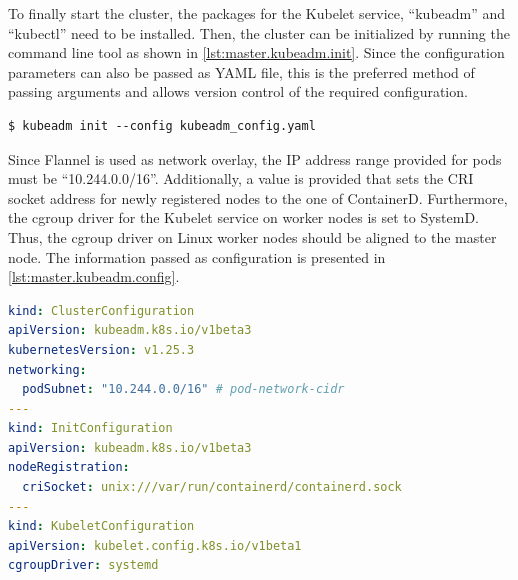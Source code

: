 To finally start the cluster, the packages for the Kubelet service, \enquote{kubeadm} and \enquote{kubectl} need to be installed. Then, the cluster can be initialized by running the command line tool as shown in \autoref{lst:master.kubeadm.init}. Since the configuration parameters can also be passed as YAML file, this is the preferred method of passing arguments and allows version control of the required configuration.
\begin{lstlisting}[label=lst:master.kubeadm.init, caption={Bash command for setting up the cluster}, morekeywords={sudo, kubeadm}, numbers=none]
$ kubeadm init --config kubeadm_config.yaml
\end{lstlisting}

Since Flannel is used as network overlay, the \ac{IP} address range provided for pods must be \enquote{10.244.0.0/16}\cite{GitHubKubernetesSIGWindowsTools.20230213}. Additionally, a value is provided that sets the \ac{CRI} socket address for newly registered nodes to the one of ContainerD. Furthermore, the \ac{cgroup} driver for the Kubelet service on worker nodes is set to SystemD. Thus, the \ac{cgroup} driver on Linux worker nodes should be aligned to the master node.
The information passed as configuration is presented in \autoref{lst:master.kubeadm.config}.
\begin{lstlisting}[label=lst:master.kubeadm.config, caption={YAML configuration for providing configuration for the cluster and newly registered ndoes. (\textit{Distribution/Controlplane/kubeadm\_config.yaml})}, language=yaml]
kind: ClusterConfiguration
apiVersion: kubeadm.k8s.io/v1beta3
kubernetesVersion: v1.25.3
networking:
  podSubnet: "10.244.0.0/16" # pod-network-cidr
---
kind: InitConfiguration
apiVersion: kubeadm.k8s.io/v1beta3
nodeRegistration:
  criSocket: unix:///var/run/containerd/containerd.sock
---
kind: KubeletConfiguration
apiVersion: kubelet.config.k8s.io/v1beta1
cgroupDriver: systemd
\end{lstlisting}



